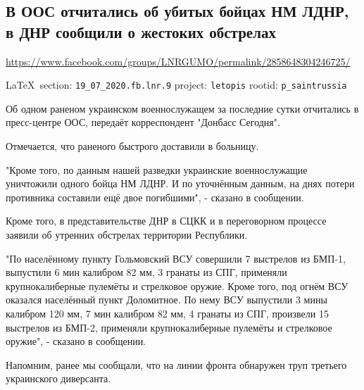  
 

\subsection{В ООС отчитались об убитых бойцах НМ ЛДНР, в ДНР сообщили о жестоких обстрелах}
\label{sec:19_07_2020.fb.lnr.9}
\url{https://www.facebook.com/groups/LNRGUMO/permalink/2858648304246725/}
  
\vspace{0.5cm}
{\small\LaTeX~section: \verb|19_07_2020.fb.lnr.9| project: \verb|letopis| rootid: \verb|p_saintrussia|}
\vspace{0.5cm}

Об одном раненом украинском военнослужащем за последние сутки отчитались в
пресс-центре ООС, передаёт корреспондент "Донбасс Сегодня".

Отмечается, что раненого быстрого доставили в больницу.

"Кроме того, по данным нашей разведки украинские военнослужащие уничтожили
одного бойца НМ ЛДНР. И по уточнённым данным, на днях потери противника
составили ещё двое погибшими", - сказано в сообщении.

Кроме того, в представительстве ДНР в СЦКК и в переговорном процессе заявили об
утренних обстрелах территории Республики.

"По населённому пункту Гольмовский ВСУ совершили 7 выстрелов из БМП-1,
выпустили 6 мин калибром 82 мм, 3 гранаты из СПГ, применяли крупнокалиберные
пулемёты и стрелковое оружие. Кроме того, под огнём ВСУ оказался населённый
пункт Доломитное. По нему ВСУ выпустили 3 мины калибром 120 мм, 7 мин калибром
82 мм, 4 гранаты из СПГ, произвели 15 выстрелов из БМП-2, применяли
крупнокалиберные пулемёты и стрелковое оружие", - сказано в сообщении.

Напомним, ранее мы сообщали, что на линии фронта обнаружен труп третьего
украинского диверсанта. 
